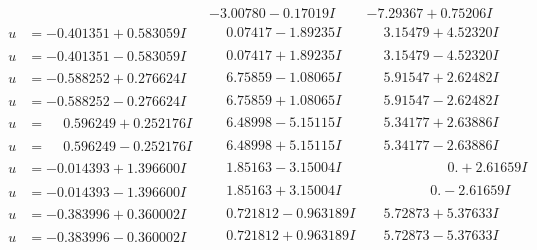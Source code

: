 \documentclass[1p]{elsarticle_modified}
\theoremstyle{definition}
\begin{document}
$$\begin{array}{c|c|c}
 & -3.00780 - 0.17019 I & -7.29367 + 0.75206 I \\ \hline\begin{aligned}
u &= -0.401351 + 0.583059 I\end{aligned}
 & \phantom{-}0.07417 - 1.89235 I & \phantom{-}3.15479 + 4.52320 I \\ \hline\begin{aligned}
u &= -0.401351 - 0.583059 I\end{aligned}
 & \phantom{-}0.07417 + 1.89235 I & \phantom{-}3.15479 - 4.52320 I \\ \hline\begin{aligned}
u &= -0.588252 + 0.276624 I\end{aligned}
 & \phantom{-}6.75859 - 1.08065 I & \phantom{-}5.91547 + 2.62482 I \\ \hline\begin{aligned}
u &= -0.588252 - 0.276624 I\end{aligned}
 & \phantom{-}6.75859 + 1.08065 I & \phantom{-}5.91547 - 2.62482 I \\ \hline\begin{aligned}
u &= \phantom{-}0.596249 + 0.252176 I\end{aligned}
 & \phantom{-}6.48998 - 5.15115 I & \phantom{-}5.34177 + 2.63886 I \\ \hline\begin{aligned}
u &= \phantom{-}0.596249 - 0.252176 I\end{aligned}
 & \phantom{-}6.48998 + 5.15115 I & \phantom{-}5.34177 - 2.63886 I \\ \hline\begin{aligned}
u &= -0.014393 + 1.396600 I\end{aligned}
 & \phantom{-}1.85163 - 3.15004 I & \phantom{-0.000000 -}0. + 2.61659 I \\ \hline\begin{aligned}
u &= -0.014393 - 1.396600 I\end{aligned}
 & \phantom{-}1.85163 + 3.15004 I & \phantom{-0.000000 } 0. - 2.61659 I \\ \hline\begin{aligned}
u &= -0.383996 + 0.360002 I\end{aligned}
 & \phantom{-}0.721812 - 0.963189 I & \phantom{-}5.72873 + 5.37633 I \\ \hline\begin{aligned}
u &= -0.383996 - 0.360002 I\end{aligned}
 & \phantom{-}0.721812 + 0.963189 I & \phantom{-}5.72873 - 5.37633 I \\ \hline\begin{aligned}

\end{aligned}
\end{array}$$
\end{document}
